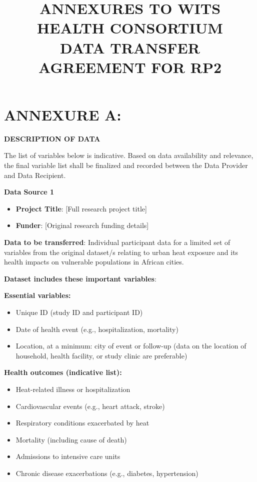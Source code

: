 \documentclass[12pt,letterpaper]{article}
\title{\textbf{ANNEXURES TO WITS HEALTH CONSORTIUM\\DATA TRANSFER AGREEMENT FOR RP2}}
\author{}
\date{}
\begin{document}
\maketitle

\section*{ANNEXURE A:}

\textbf{DESCRIPTION OF DATA}

The list of variables below is indicative. Based on data availability and relevance, the final variable list shall be finalized and recorded between the Data Provider and Data Recipient.

\textbf{Data Source 1}

\begin{itemize}
    \item \textbf{Project Title}: [Full research project title]
    \item \textbf{Funder}: [Original research funding details]
\end{itemize}

\textbf{Data to be transferred}: Individual participant data for a limited set of variables from the original dataset/s relating to urban heat exposure and its health impacts on vulnerable populations in African cities.

\textbf{Dataset includes these important variables}:

\textbf{Essential variables:}
\begin{itemize}
    \item Unique ID (study ID and participant ID)
    \item Date of health event (e.g., hospitalization, mortality)
    \item Location, at a minimum: city of event or follow-up (data on the location of household, health facility, or study clinic are preferable)
\end{itemize}

\textbf{Health outcomes (indicative list):}
\begin{itemize}
    \item Heat-related illness or hospitalization
    \item Cardiovascular events (e.g., heart attack, stroke)
    \item Respiratory conditions exacerbated by heat
    \item Mortality (including cause of death)
    \item Admissions to intensive care units
    \item Chronic disease exacerbations (e.g., diabetes, hypertension)
\end{itemize}
\end{document}
